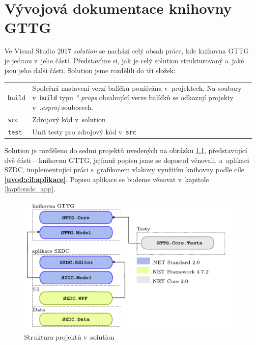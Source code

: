 \chapter{Vývojová dokumentace knihovny GTTG}
Ve Visual Studio 2017 \textit{solution} se nachází celý obsah práce, kde knihovna GTTG je jednou z~jeho částí.
Představíme si, jak je celý solution strukturovaný a~jaké jsou jeho další části. Solution jsme rozdělili
do tří složek:
\newline
\newline
\renewcommand\arraystretch{1.2}
\begin{tabular}{ m{} m{} }
\texttt{build} & Společná nastavení verzí balíčků používána v~projektech. Na soubory v~\texttt{build} typu \textit{*.props} obsahující verze balíčků se odkazují projekty v~\textit{.csproj} souborech.\\
\texttt{src} & Zdrojový kód v~solution\\ 
\texttt{test} & Unit testy pro zdrojový kód v~\texttt{src}
\end{tabular}
\newline
\newline
Solution je rozděleno do sedmi projektů uvedených na obrázku \ref{fig:kap4:solution_structure}, představující dvě části -- knihovnu GTTG, jejímuž popisu jsme se doposud věnovali, a~aplikaci SZDC, implementující práci s~grafikonem vlakovy využitím knihovny podle cíle \textbf{\ref{uvod:cil:aplikace}}. Popisu aplikace se budeme věnovat v~kapitole \ref{kap6:szdc_app}.

\begin{figure}[!hbt]
	\includegraphics[width=\textwidth]{../img/kap4_solution_structure}
	\caption{Struktura projektů v~solution}
	\label{fig:kap4:solution_structure}
\end{figure}

